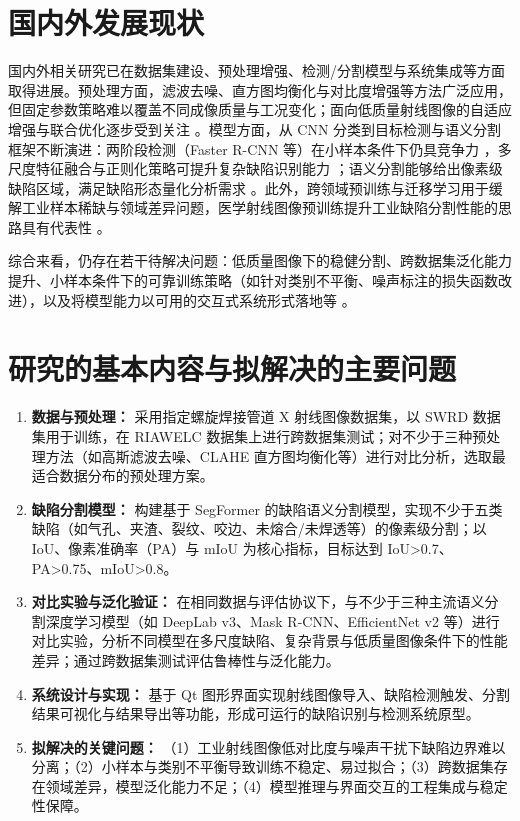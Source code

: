 \documentclass{cjlu_proposal}
\begin{document}
\section{国内外发展现状}
国内外相关研究已在数据集建设、预处理增强、检测/分割模型与系统集成等方面取得进展。预处理方面，滤波去噪、直方图均衡化与对比度增强等方法广泛应用，但固定参数策略难以覆盖不同成像质量与工况变化；面向低质量射线图像的自适应增强与联合优化逐步受到关注 \cite{Hou2020_ReviewWeldDefectDetection, Guo2021_ContrastEnhancementGAN}。模型方面，从 CNN 分类到目标检测与语义分割框架不断演进：两阶段检测（Faster R-CNN 等）在小样本条件下仍具竞争力 \cite{Ajmi2023_FasterRCNNWeldDefects}，多尺度特征融合与正则化策略可提升复杂缺陷识别能力 \cite{Dai2025_CCBFERCNN}；语义分割能够给出像素级缺陷区域，满足缺陷形态量化分析需求 \cite{Ronneberger2015_UNet, Yu2025_IndustrialDefectRecognition}。此外，跨领域预训练与迁移学习用于缓解工业样本稀缺与领域差异问题，医学射线图像预训练提升工业缺陷分割性能的思路具有代表性 \cite{Yu2025_IndustrialDefectRecognition, Irvin2019_CheXpertDataset}。

综合来看，仍存在若干待解决问题：低质量图像下的稳健分割、跨数据集泛化能力提升、小样本条件下的可靠训练策略（如针对类别不平衡、噪声标注的损失函数改进），以及将模型能力以可用的交互式系统形式落地等 \cite{Chen2022_ImprovedCrossEntropyLoss}。

\section{研究的基本内容与拟解决的主要问题}
\begin{enumerate}[leftmargin=*]
  \item \textbf{数据与预处理：} 采用指定螺旋焊接管道 X 射线图像数据集，以 SWRD 数据集用于训练，在 RIAWELC 数据集上进行跨数据集测试；对不少于三种预处理方法（如高斯滤波去噪、CLAHE 直方图均衡化等）进行对比分析，选取最适合数据分布的预处理方案。
  \item \textbf{缺陷分割模型：} 构建基于 SegFormer 的缺陷语义分割模型，实现不少于五类缺陷（如气孔、夹渣、裂纹、咬边、未熔合/未焊透等）的像素级分割；以 IoU、像素准确率（PA）与 mIoU 为核心指标，目标达到 IoU>0.7、PA>0.75、mIoU>0.8。
  \item \textbf{对比实验与泛化验证：} 在相同数据与评估协议下，与不少于三种主流语义分割深度学习模型（如 DeepLab v3、Mask R-CNN、EfficientNet v2 等）进行对比实验，分析不同模型在多尺度缺陷、复杂背景与低质量图像条件下的性能差异；通过跨数据集测试评估鲁棒性与泛化能力。
  \item \textbf{系统设计与实现：} 基于 Qt 图形界面实现射线图像导入、缺陷检测触发、分割结果可视化与结果导出等功能，形成可运行的缺陷识别与检测系统原型。
  \item \textbf{拟解决的关键问题：} （1）工业射线图像低对比度与噪声干扰下缺陷边界难以分离；（2）小样本与类别不平衡导致训练不稳定、易过拟合；（3）跨数据集存在领域差异，模型泛化能力不足；（4）模型推理与界面交互的工程集成与稳定性保障。
\end{enumerate}
\end{document}
